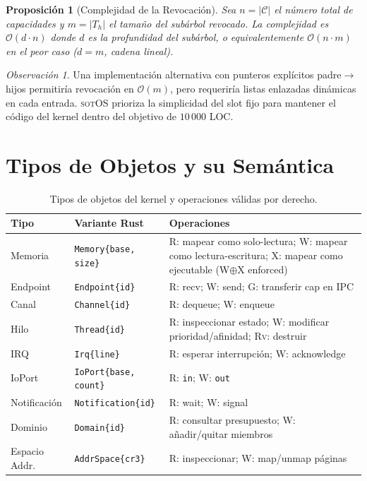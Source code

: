 \documentclass[11pt,twoside,openright]{book}
\theoremstyle{definition}
\theoremstyle{plain}
\newtheorem{proposition}[theorem]{Proposición}
\theoremstyle{remark}
\newtheorem{remark}{Observación}[chapter]
\newcommand{\sotos}{\textsc{sotOS}}
\newcommand{\bigO}{\mathcal{O}}
\begin{document}
\begin{proposition}[Complejidad de la Revocación]
\label{prop:revoke-complexity}
Sea $n = |\mathcal{C}|$ el número total de capacidades y $m = |T_h|$ el tamaño del
subárbol revocado. La complejidad es $\bigO(d \cdot n)$ donde $d$ es la profundidad
del subárbol, o equivalentemente $\bigO(n \cdot m)$ en el peor caso ($d = m$, cadena lineal).
\end{proposition}

\begin{remark}
Una implementación alternativa con punteros explícitos padre$\to$hijos permitiría
revocación en $\bigO(m)$, pero requeriría listas enlazadas dinámicas en cada entrada.
\sotos{} prioriza la simplicidad del slot fijo para mantener el código del kernel dentro
del objetivo de $10\,000$ LOC.
\end{remark}

\section{Tipos de Objetos y su Semántica}

\begin{table}[ht]
\centering
\caption{Tipos de objetos del kernel y operaciones válidas por derecho.}
\label{tab:cap-objects}
\begin{tabular}{@{}llp{7cm}@{}}
\toprule
\textbf{Tipo} & \textbf{Variante Rust} & \textbf{Operaciones} \\
\midrule
Memoria & \texttt{Memory\{base, size\}} &
    \textsc{R}: mapear como solo-lectura;
    \textsc{W}: mapear como lectura-escritura;
    \textsc{X}: mapear como ejecutable (W$\oplus$X enforced) \\
Endpoint & \texttt{Endpoint\{id\}} &
    \textsc{R}: recv;
    \textsc{W}: send;
    \textsc{G}: transferir cap en IPC \\
Canal & \texttt{Channel\{id\}} &
    \textsc{R}: dequeue;
    \textsc{W}: enqueue \\
Hilo & \texttt{Thread\{id\}} &
    \textsc{R}: inspeccionar estado;
    \textsc{W}: modificar prioridad/afinidad;
    \textsc{Rv}: destruir \\
IRQ & \texttt{Irq\{line\}} &
    \textsc{R}: esperar interrupción;
    \textsc{W}: acknowledge \\
IoPort & \texttt{IoPort\{base, count\}} &
    \textsc{R}: \texttt{in};
    \textsc{W}: \texttt{out} \\
Notificación & \texttt{Notification\{id\}} &
    \textsc{R}: wait;
    \textsc{W}: signal \\
Dominio & \texttt{Domain\{id\}} &
    \textsc{R}: consultar presupuesto;
    \textsc{W}: añadir/quitar miembros \\
Espacio Addr. & \texttt{AddrSpace\{cr3\}} &
    \textsc{R}: inspeccionar;
    \textsc{W}: map/unmap páginas \\
\bottomrule
\end{tabular}
\end{table}
\end{document}
